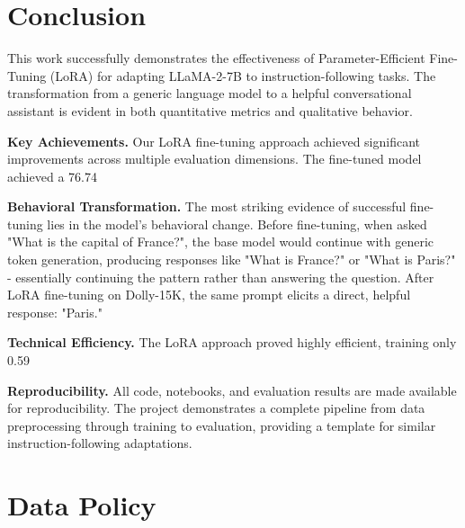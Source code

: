 \documentclass{assignment7_report}
\begin{document}
\section{Conclusion}
\vspace*{-3mm}

This work successfully demonstrates the effectiveness of Parameter-Efficient Fine-Tuning (LoRA) for adapting LLaMA-2-7B to instruction-following tasks. The transformation from a generic language model to a helpful conversational assistant is evident in both quantitative metrics and qualitative behavior.

\textbf{Key Achievements.} Our LoRA fine-tuning approach achieved significant improvements across multiple evaluation dimensions. The fine-tuned model achieved a 76.74%

\textbf{Behavioral Transformation.} The most striking evidence of successful fine-tuning lies in the model's behavioral change. Before fine-tuning, when asked "What is the capital of France?", the base model would continue with generic token generation, producing responses like "What is France?" or "What is Paris?" - essentially continuing the pattern rather than answering the question. After LoRA fine-tuning on Dolly-15K, the same prompt elicits a direct, helpful response: "Paris."

\textbf{Technical Efficiency.} The LoRA approach proved highly efficient, training only 0.59%

\textbf{Reproducibility.} All code, notebooks, and evaluation results are made available for reproducibility. The project demonstrates a complete pipeline from data preprocessing through training to evaluation, providing a template for similar instruction-following adaptations.

\section{Data Policy}
\vspace*{-3mm}
\end{document}
